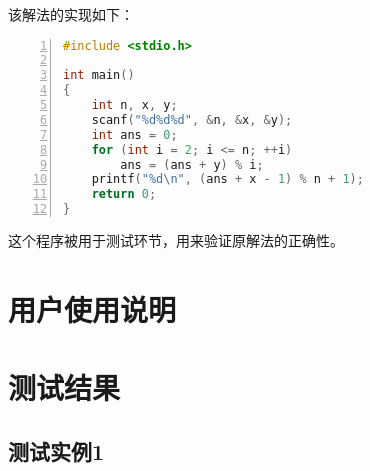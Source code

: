 \documentclass{article}
\begin{document}
该解法的实现如下：

\begin{lstlisting}[language={C},
    numbers=left,
    numberstyle=\tiny\menlo,
    basicstyle=\small\menlo]
#include <stdio.h>

int main()
{
    int n, x, y;
    scanf("%d%d%d", &n, &x, &y);
    int ans = 0;
    for (int i = 2; i <= n; ++i)
        ans = (ans + y) % i;
    printf("%d\n", (ans + x - 1) % n + 1);
    return 0;
}
\end{lstlisting}

这个程序被用于测试环节，用来验证原解法的正确性。

\section{用户使用说明}

\section{测试结果}

\subsection{测试实例1}
\end{document}
